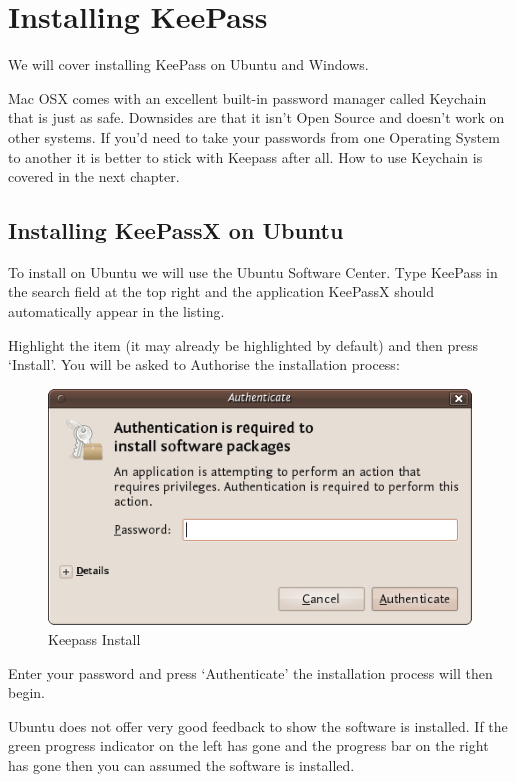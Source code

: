 \section{Installing KeePass}

We will cover installing KeePass on Ubuntu and Windows.

Mac OSX comes with an excellent built-in password manager called
Keychain that is just as safe. Downsides are that it isn't Open Source
and doesn't work on other systems. If you'd need to take your passwords
from one Operating System to another it is better to stick with Keepass
after all. How to use Keychain is covered in the next chapter.

\subsection{Installing KeePassX on Ubuntu}

To install on Ubuntu we will use the Ubuntu Software Center. Type
KeePass in the search field at the top right and the application
KeePassX should automatically appear in the listing.

Highlight the item (it may already be highlighted by default) and then
press `Install'. You will be asked to Authorise the installation
process:

\begin{figure}[htbp]
\centering
\includegraphics{keepass_1.png}
\caption{Keepass Install}
\end{figure}

Enter your password and press `Authenticate' the installation process
will then begin.

Ubuntu does not offer very good feedback to show the software is
installed. If the green progress indicator on the left has gone and the
progress bar on the right has gone then you can assumed the software is
installed.

